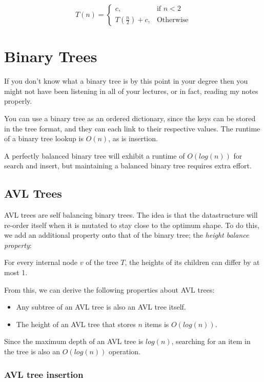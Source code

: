 \[
  T(n) = \begin{cases}
    c, & \text{if $n<2$}\\
    T(\frac{n}{2}) + c, & \text{Otherwise}
  \end{cases}
\]

\section{Binary Trees}

If you don't know what a binary tree is by this point in your degree then you
might not have been listening in all of your lectures, or in fact, reading my
notes properly.

You can use a binary tree as an ordered dictionary, since the keys can be stored
in the tree format, and they can each link to their respective values. The
runtime of a binary tree lookup is $O(n)$, as is insertion.

A perfectly balanced binary tree will exhibit a runtime of $O(log(n))$ for
search and insert, but maintaining a balanced binary tree requires extra effort.

\subsection{AVL Trees}

AVL trees are self balancing binary trees. The idea is that the datastructure
will re-order itself when it is mutated to stay close to the optimum shape. To
do this, we add an additional property onto that of the binary tree; the
\textit{height balance property}:

For every internal node $v$ of the tree $T$, the heights of its children can
differ by at most 1.

From this, we can derive the following properties about AVL trees:

\begin{itemize}
  \item Any subtree of an AVL tree is also an AVL tree itself.
  \item The height of an AVL tree that stores $n$ items is $O(log(n))$.
\end{itemize}

Since the maximum depth of an AVL tree is $log(n)$, searching for an item in the
tree is also an $O(log(n))$ operation.

\subsubsection{AVL tree insertion}

